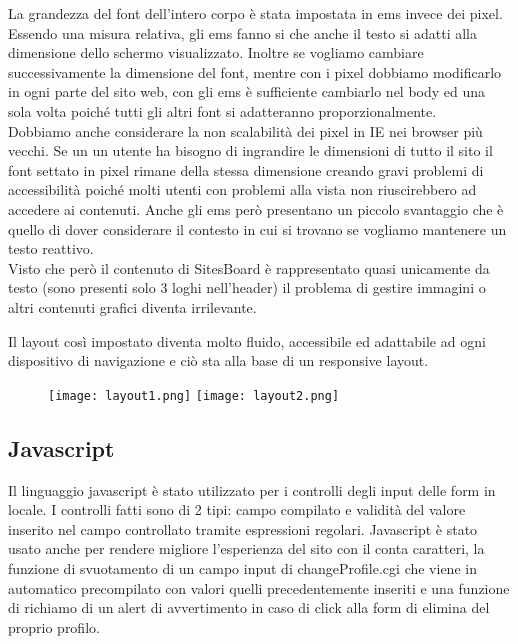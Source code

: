 \documentclass[12pt]{article}
\begin{document}
	La grandezza del font dell'intero corpo è stata impostata in ems invece dei pixel.
	Essendo una misura relativa, gli ems fanno si che anche il testo si adatti alla dimensione dello schermo visualizzato. Inoltre se vogliamo cambiare successivamente la dimensione del font, mentre con i pixel dobbiamo modificarlo in ogni parte del sito web, con gli ems è sufficiente cambiarlo nel body ed una sola volta poiché tutti gli altri font si adatteranno proporzionalmente.\\
	Dobbiamo anche considerare la non scalabilità dei pixel in IE nei browser più vecchi. Se un un utente ha bisogno di ingrandire le dimensioni di tutto il sito il font settato in pixel rimane della stessa dimensione creando gravi problemi di accessibilità poiché molti utenti con problemi alla vista non riuscirebbero ad accedere ai contenuti.
	Anche gli ems però presentano un piccolo svantaggio che è quello di dover considerare il contesto in cui si trovano se vogliamo mantenere un testo reattivo.\\ Visto che però il contenuto di SitesBoard è rappresentato quasi unicamente da testo (sono presenti solo 3 loghi nell'header) il problema di gestire immagini o altri contenuti grafici diventa irrilevante.
	
	Il layout così impostato diventa molto fluido, accessibile ed adattabile ad ogni dispositivo di navigazione e ciò sta alla base di un responsive layout.
	
	\newpage
	
	
	\begin{figure}
	\texttt{[image: layout1.png]}
	\texttt{[image: layout2.png]}
	\hspace{1.5in}
	\end{figure}
	
	\subsection{Javascript}
	
	Il linguaggio javascript è stato utilizzato per i controlli degli input delle form in locale.
	I controlli fatti sono di 2 tipi: campo compilato e validità del valore inserito nel campo controllato tramite espressioni regolari.
	Javascript è stato usato anche per rendere migliore l'esperienza del sito con il conta caratteri, la funzione di svuotamento di un campo input di changeProfile.cgi che viene in automatico precompilato con valori quelli precedentemente inseriti e una funzione di richiamo di un alert di avvertimento in caso di click alla form di elimina del proprio profilo.
	
\end{document}
